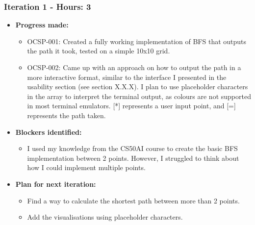 \subsubsection{Iteration 1 - Hours: 3}
\begin{itemize}
    \item \textbf{Progress made:}
    \begin{itemize}
        \item OCSP-001: Created a fully working implementation of BFS that outputs the path it took, tested on a simple 10x10 grid.
        \item OCSP-002: Came up with an approach on how to output the path in a more interactive format, similar to the interface I presented in the usability section (see section X.X.X). I plan to use placeholder characters in the array to interpret the terminal output, as colours are not supported in most terminal emulators. [*] represents a user input point, and [=] represents the path taken.
    \end{itemize}
    \item \textbf{Blockers identified:}
    \begin{itemize}
        \item I used my knowledge from the CS50AI course to create the basic BFS implementation between 2 points. However, I struggled to think about how I could implement multiple points.

    \end{itemize}
    \item \textbf{Plan for next iteration:}
    \begin{itemize}
        \item Find a way to calculate the shortest path between more than 2 points.
        \item Add the visualisations using placeholder characters.
    \end{itemize}
\end{itemize}

